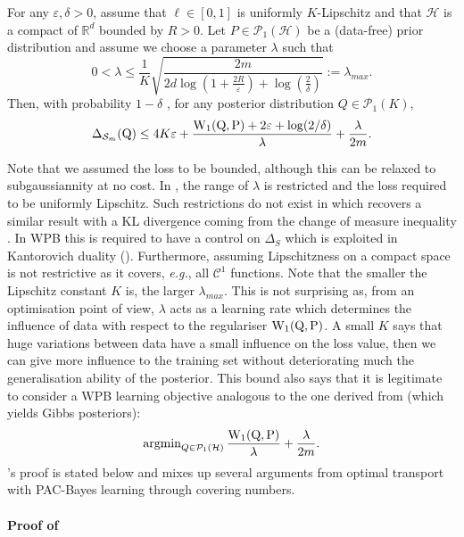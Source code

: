 \begin{theorem}
\label{th: compact_catoni}
For any $\varepsilon,\delta>0$, assume that $\ell\in [0,1]$ is uniformly $K$-Lipschitz and that $\mathcal{H}$ is a compact of $\mathbb{R}^d$ bounded by $R>0$. Let $P\in \mathcal{P}_1(\mathcal{H})$ be a (data-free) prior distribution and assume we choose a parameter $\lambda$ such that
\[ 0< \lambda \leq  \frac{1}{K}\sqrt{\frac{2m}{2d\log(1+\frac{2R}{\varepsilon})+\log(\frac{2}{\delta})}}:= \lambda_{max}. \]
Then, with probability $1-\delta$ , for any posterior distribution $Q\in\mathcal{P}_1(K)$,
\[ \Delta_{\mathcal{S}_m}(\mathrm{Q}) \leq 4K\varepsilon + \frac{\mathrm{W}_{1}(\mathrm{Q},\mathrm{P})+2\varepsilon +\log(2/\delta)}{\lambda} + \frac{\lambda}{2m}.   \]
\end{theorem}
Note that we assumed the loss to be bounded, although this can be relaxed to subgaussiannity at no cost.
In , the range of $\lambda$ is restricted and the loss required to be uniformly Lipschitz. Such restrictions do not exist in \citet[Theorem 4.1]{alquier2016properties} which recovers a similar result with a KL divergence coming from the change of measure inequality \citep{donsker1976asymp}. In WPB this is required to have a control on $\Delta_S$ which is exploited in Kantorovich duality ().
Furthermore, assuming Lipschitzness on a compact space is not restrictive as it covers, \emph{e.g.}, all $\mathcal{C}^1$ functions.
Note that the smaller the Lipschitz constant $K$ is, the larger $\lambda_{max}$.
This is not surprising as, from an optimisation point of view, $\lambda$ acts as a learning rate which determines the influence of data with respect to the regulariser $\mathrm{W}_{1}(\mathrm{Q},\mathrm{P})$.
A small $K$ says that huge variations between data have a small influence on the loss value, then we can give more influence to the training set without deteriorating much the generalisation ability of the posterior.
This bound also says that it is legitimate to consider a WPB learning objective analogous to the one derived from \citet[Theorem 4.1]{alquier2016properties} (which yields Gibbs posteriors):
$$\operatorname{argmin}_{Q\in\mathcal{P}_1(\mathbb{\mathcal{H}})}\frac{\mathrm{W}_{1}(\mathrm{Q},\mathrm{P})}{\lambda} + \frac{\lambda}{2m}.$$
's proof is stated below and mixes up several arguments from optimal transport with PAC-Bayes learning through covering numbers.
\paragraph{Proof of }

